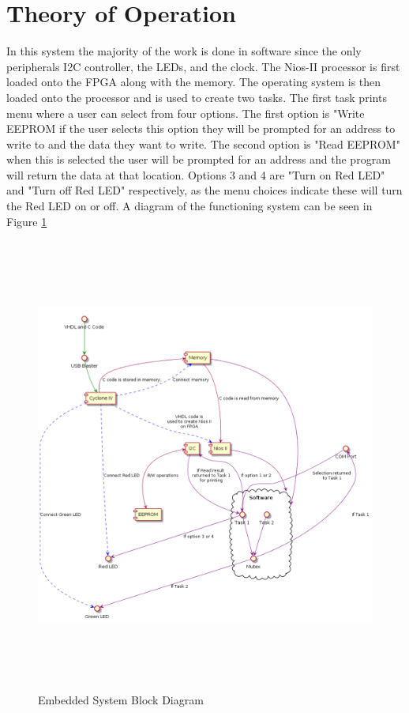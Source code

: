\documentclass[10pt,a4paper]{article}
\begin{document}
	\section{Theory of Operation}
	In this system the majority of the work is done in software since the only peripherals I2C controller, the LEDs, and the clock. The Nios-II processor is first loaded onto the FPGA along with the memory. The operating system is then loaded onto the processor and is used to create two tasks. The first task prints menu where a user can select from four options. The first option is "Write EEPROM if the user selects this option they will be prompted for an address to write to and the data they want to write. The second option is "Read EEPROM" when this is selected the user will be prompted for an address and the program will return the data at that location. Options 3 and 4 are "Turn on Red LED" and "Turn off Red LED" respectively, as the menu choices indicate these will turn the Red LED on or off. A diagram of the functioning system can be seen in Figure \ref{block} 
	\begin{figure}[H]
		\centering\includegraphics[height=15cm]{HW5_Block.png}
		\caption{Embedded System Block Diagram}
		\label{block}
	\end{figure}
\end{document}
